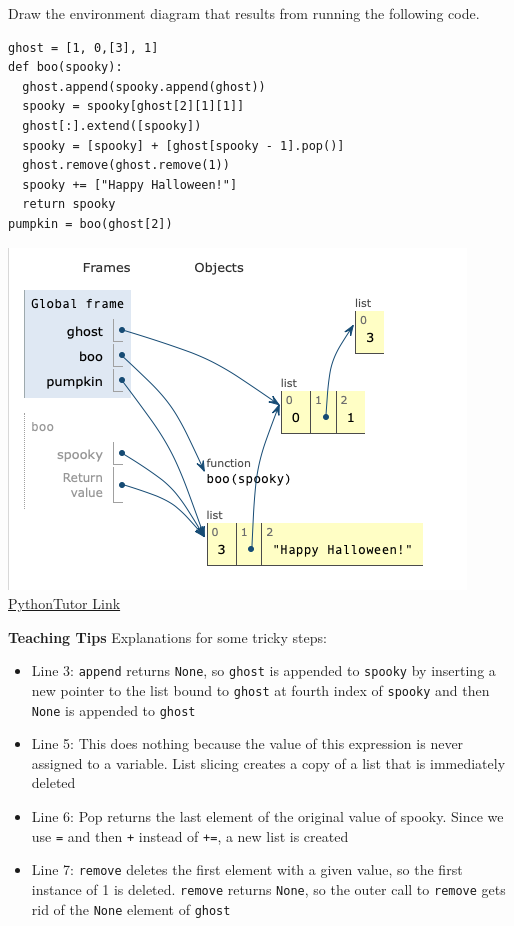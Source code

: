 \begin{blocksection}
\question Draw the environment diagram that results from running the following code.
\begin{lstlisting}
ghost = [1, 0,[3], 1]
def boo(spooky):
  ghost.append(spooky.append(ghost))
  spooky = spooky[ghost[2][1][1]]
  ghost[:].extend([spooky])
  spooky = [spooky] + [ghost[spooky - 1].pop()] 
  ghost.remove(ghost.remove(1))
  spooky += ["Happy Halloween!"]
  return spooky
pumpkin = boo(ghost[2])
\end{lstlisting}

\begin{solution}[1in]
  \includegraphics[width=.5\textwidth]{spooky-list_sol.png}
  \newline
  \href{https://tinyurl.com/2zxktfjb}{PythonTutor Link} 
\end{solution}
\begin{guide}
\textbf{Teaching Tips}
\newline
  Explanations for some tricky steps:
  \begin{itemize}
    \item Line 3: \lstinline{append} returns \lstinline{None}, so \lstinline{ghost} is appended to \lstinline{spooky} by inserting a new pointer to the list bound to \lstinline{ghost} at fourth index of \lstinline{spooky} and then \lstinline{None} is appended to \lstinline{ghost}
    \item Line 5: This does nothing because the value of this expression is never assigned to a variable. List slicing creates a copy of a list that is immediately deleted
    \item Line 6: Pop returns the last element of the original value of spooky. Since we use \lstinline{=} and then \lstinline{+} instead of \lstinline{+=}, a new list is created
    \item Line 7: \lstinline{remove} deletes the first element with a given value, so the first instance of 1 is deleted. \lstinline{remove} returns \lstinline{None}, so the outer call to \lstinline{remove} gets rid of the \lstinline{None} element of \lstinline{ghost}

\end{itemize}
\end{guide}
\end{blocksection}
